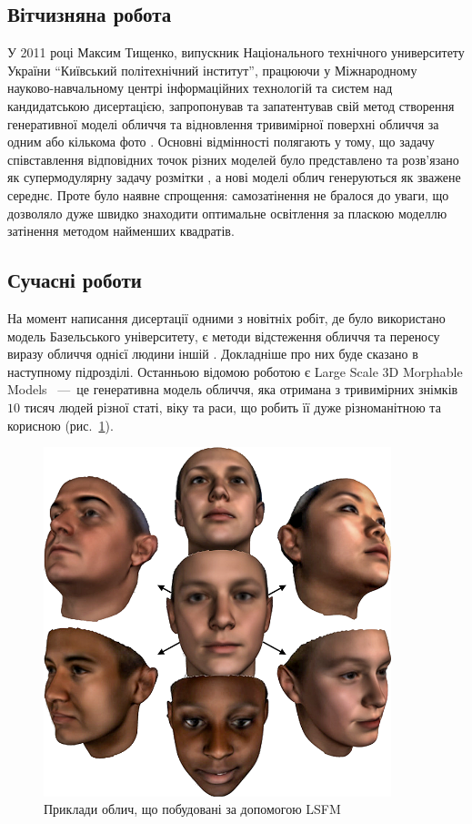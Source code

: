 \subsection{Вітчизняна робота}

У 2011 році Максим Тищенко,
випускник Національного технічного университету України
``Київський політехнічний інститут'',
працюючи у Міжнародному науково-навчальному центрі
інформаційних технологій та систем над кандидатською дисертацією,
запропонував та запатентував
свій метод створення генеративної моделі обличчя та відновлення
тривимірної поверхні обличчя за одним або кількома фото \cite{tyshchenko:2011}.
Основні відмінності полягають у тому,
що задачу співставлення відповідних точок різних моделей
було представлено та розв'язано як супермодулярну
задачу розмітки \cite{Lovasz1983},
а нові моделі облич генеруються як зважене середнє.
Проте було наявне спрощення: самозатінення не бралося до уваги,
що дозволяло дуже швидко знаходити оптимальне освітлення
за пласкою моделлю затінення методом найменших квадратів.

\subsection{Сучасні роботи}

На момент написання дисертації одними з новітніх робіт,
де було використано модель Базельського університету,
є методи відстеження обличчя \cite{Saito2016}
та переносу виразу обличчя однієї людини іншій \cite{thies2016face}.
Докладніше про них буде сказано в наступному підрозділі.
Останньою відомою роботою
є Large Scale 3D Morphable Models \cite{Booth:2017}~---~це
генеративна модель обличчя, яка отримана з тривимірних знімків $10$ тисяч людей
різної статі, віку та раси, що робить її дуже різноманітною та корисною
(рис.~\ref{fig:problems:lsfm}).

\begin{figure}[h]
  \centering
    \includegraphics[width=0.9\textwidth]{images/lsfm}
  \caption{Приклади облич, що побудовані за допомогою LSFM}
  \label{fig:problems:lsfm}
\end{figure}
